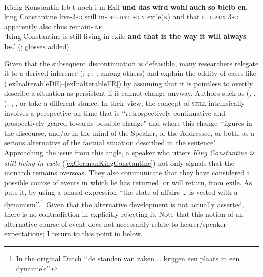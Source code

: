 \begin{exe}
\ex \label{exGermanKingConstantine}\\
\gll König Konstantin leb-t noch i-m Exil \textbf{und} \textbf{das} \textbf{wird} \textbf{wohl} \textbf{auch} \textbf{so} \textbf{bleib}-\textbf{en}.\\
king Constantine live-3\textsc{sg} still in-\textsc{def}.\textsc{dat}.\textsc{sg}.\textsc{n} exile(\textsc{n}) and that \textsc{fut}.\textsc{aux}:3\textsc{sg} apparently also thus remain-\textsc{inf}\\
\glt \lq King Constantine is still living in exile \textbf{and that is the way it will always be}.' (\cite[176]{Koenig1977}; glosses added)
\end{exe}

Given that the subsequent discontinuation is defeasible, many researchers relegate it to a derived inference (\cite{Abraham1980}; \cite{Klein2018}; \cite{Koenig1977}; \cite{Muller1975}, among others) and explain the oddity of cases like (\ref{exInalterableDE}–\ref{exInalterableFR}) by assuming that it is pointless to overtly describe a situation as persistent if it cannot change anyway. Authors such as \citeauthor{vanderAuwera1993} (\citeyear{vanderAuwera1991BeyondDuality}, \citeyear{vanderAuwera1993}, \citeyear[38–42]{vanderAuwera1998}),  \textcite[ch. 2]{vanBaar1997}, \textcite{Michaelis1993}, or \textcite[ch. 3]{Vandeweghe1992} take a different stance. In their view, the concept of \textsc{still} intrinsically involves a perspective on time that is \lq\lq retrospectively continuative and prospectively geared towards possible change" \parencite[40]{vanderAuwera1998} and where this change \lq\lq figures in the discourse, and/or in the mind of the Speaker, of the Addressee, or both, as a serious alternative of the factual situation described in the sentence" \parencite[41]{vanBaar1997}. Approaching the issue from this angle, a speaker who utters \textit{King Constantine is still living in exile} (\ref{exGermanKingConstantine}) not only signals that the monarch remains overseas. They also communicate that they have considered a possible course of events in which he has returned, or will return, from exile. As \textcite[1]{Vandeweghe1992} puts it, by using a phasal expression \lq\lq the state-of-affairs … is vested with a dynamism\rq\rq.\footnote{In the original Dutch \lq\lq de standen van zaken … krijgen een plaats in een dynamiek\rq\rq{}.} Given that the alternative development is not actually asserted, there is no contradiction in explicitly rejecting it. Note that this notion of an alternative course of event does not necessarily relate to hearer/speaker expectations; I return to this point in  below.

